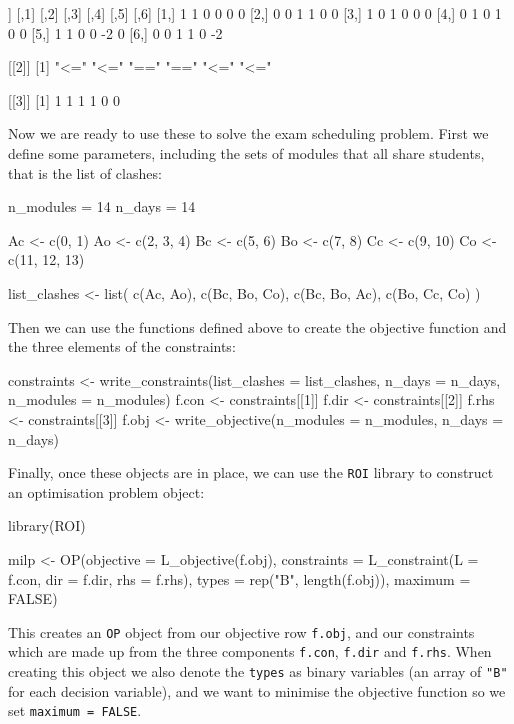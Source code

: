 \begin{Rout-no-test}
[[1]]
     [,1] [,2] [,3] [,4] [,5] [,6]
[1,]    1    1    0    0    0    0
[2,]    0    0    1    1    0    0
[3,]    1    0    1    0    0    0
[4,]    0    1    0    1    0    0
[5,]    1    1    0    0   -2    0
[6,]    0    0    1    1    0   -2

[[2]]
[1] "<=" "<=" "==" "==" "<=" "<="

[[3]]
[1] 1 1 1 1 0 0
\end{Rout-no-test}

Now we are ready to use these to solve the exam scheduling problem.
First we define some parameters, including the sets of modules that all share
students, that is the list of clashes:

\begin{Rin-no-test}
n_modules = 14
n_days = 14

Ac <- c(0, 1)
Ao <- c(2, 3, 4)
Bc <- c(5, 6)
Bo <- c(7, 8)
Cc <- c(9, 10)
Co <- c(11, 12, 13)

list_clashes <- list(
  c(Ac, Ao),
  c(Bc, Bo, Co),
  c(Bc, Bo, Ac),
  c(Bo, Cc, Co)
)
\end{Rin-no-test}

Then we can use the functions defined above to create the objective function and
the three elements of the constraints:

\begin{Rin-no-test}
constraints <- write_constraints(list_clashes = list_clashes,
                                 n_days = n_days,
                                 n_modules = n_modules)
f.con <- constraints[[1]]
f.dir <- constraints[[2]]
f.rhs <- constraints[[3]]
f.obj <- write_objective(n_modules = n_modules, n_days = n_days)
\end{Rin-no-test}

Finally, once these objects are in place, we can use the
\texttt{ROI} library to construct an optimisation problem object:

\begin{Rin-no-test}
library(ROI)

milp <- OP(objective = L_objective(f.obj),
           constraints = L_constraint(L = f.con,
                                      dir = f.dir,
                                      rhs = f.rhs),
           types = rep("B", length(f.obj)), 
           maximum = FALSE)
\end{Rin-no-test}

This creates an \texttt{OP} object from our objective row
\texttt{f.obj}, and our constraints which are made up from the three
components \texttt{f.con}, \texttt{f.dir} and
\texttt{f.rhs}.
When creating this object we also denote the \texttt{types} as binary
variables (an array of \texttt{"B"} for each decision variable), and we
want to minimise the objective function so we set
\texttt{maximum = FALSE}.

